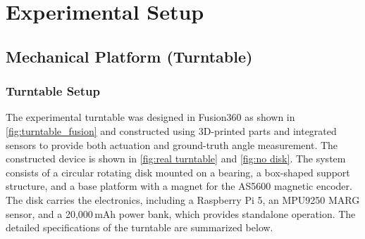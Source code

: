 \documentclass{iutbscthesis}
\begin{document}
\chapter{Experimental Setup} \label{chapter:setup}

\section{Mechanical Platform (Turntable)}

\subsection{Turntable Setup}

The experimental turntable was designed in Fusion360 as shown in \autoref{fig:turntable_fusion} and constructed using 3D-printed parts and integrated sensors 
to provide both actuation and ground-truth angle measurement. The constructed device is shown in \autoref{fig:real turntable} and \autoref{fig:no disk}. 
The system consists of a circular rotating disk mounted on a bearing, 
a box-shaped support structure, and a base platform with a magnet for the AS5600 magnetic encoder. 
The disk carries the electronics, including a Raspberry Pi 5, an MPU9250 MARG sensor, and a 20,000\,mAh power bank, 
which provides standalone operation. The detailed specifications of the turntable are summarized below.
\end{document}
